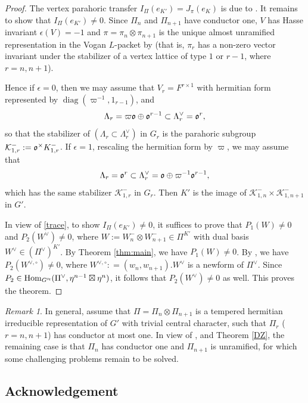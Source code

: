 \documentclass[11pt, a4paper]{amsart}
\newcommand{\CK}{{\mathcal {K}}}
\newcommand{\Hom}{{\mathrm{Hom}}}
\newcommand{\diag}{\operatorname{diag}}
\newcommand{\ve}{{\vee}}
\theoremstyle{plain}
\theoremstyle{plain}
\theoremstyle{plain}
\theoremstyle{plain}
\theoremstyle{remark}
\newtheorem{remarkl}[lem]{Remark}
\theoremstyle{definition}
\theoremstyle{plain}
\numberwithin{equation}{section}
\begin{document}
\begin{proof}
The vertex parahoric transfer  $I_\Pi(e_{K'}) = J_\pi(e_K)$ is due to \cite[Theorem 1.1]{Z}. It remains to show that $I_\Pi(e_{K'})\neq 0$. 
Since $\Pi_n$ and $\Pi_{n+1}$ have conductor one,  $V$ has Hasse invariant $\epsilon(V)= -1$ and $\pi = \pi_n\otimes \pi_{n+1}$ is the unique almost unramified representation in the Vogan $L$-packet by \cite[Lemma 3.6.7]{DZ} (that is, $\pi_r$ has a non-zero vector invariant under the stabilizer of a vertex lattice of type $1$ or $r-1$, where $r=n, n+1$).

Hence if $\epsilon =0$,  then we may assume that $V_r = F^{r\times 1}$ with hermitian form represented by $\diag(\varpi^{-1}, 1_{r-1})$,  and 
\[
\Lambda_r= \varpi\frak o \oplus \frak o^{r-1}\subset \Lambda_r^\vee = \frak o^r,
\]
so that the stabilizer of $(\Lambda_r \subset \Lambda_r^\vee)$ in $G_r$ is the parahoric subgroup $\CK_{1,r}^-:=\frak o^\times K_{1,r}^-$. If $\epsilon =1$,  rescaling the hermitian form by $\varpi$, we may assume that 
\[
\Lambda_r = \frak o^r \subset \Lambda_r^\ve = \frak o \oplus \varpi^{-1}\frak o^{r-1},
\]
which has the same stabilizer $\CK_{1,r}^-$ in $G_r$. 
Then $K'$ is the image of $\CK_{1,n}^-\times\CK_{1,n+1}^-$ in $G'$. 

In view of \eqref{trace}, to show  $I_\Pi(e_{K'})\neq 0$, it suffices to prove that $P_1(W) \neq 0$ and $P_2(W^\vee)\neq 0$, where $W:=W_n^-\otimes W_{n+1}^-\in \Pi^{K'}$ with dual basis $W^\vee \in (\Pi^\vee)^{K'}$. 
By Theorem \ref{thm:main}, we have $P_1(W)\neq 0$. By \cite[Theorem 6.1]{AM}, we have $P_2(W^{\vee,\circ})\neq 0$, where $W^{\vee, \circ}: =(w_n, w_{n+1}).W^\vee$ is a newform of $\Pi^\vee$. 
Since $P_2\in \Hom_{G'^{\sf c}}(\Pi^\vee, \eta^{n-1}\boxtimes \eta^n)$, it follows that $P_2(W^\vee)\neq 0$ as well. This proves the theorem.
\end{proof}

\begin{remarkl}
In general, assume that $\Pi=\Pi_n\otimes \Pi_{n+1}$ is a tempered hermitian irreducible representation of $G'$ with trivial central character, such that $\Pi_r$ ($r=n, n+1$) has conductor at most one. In view of \cite[Conjecture 3.10, Remark 3.11]{DZ},  \cite[Theorem 1.2]{D} and Theorem \ref{DZ}, the remaining case is that $\Pi_n$ has conductor one and $\Pi_{n+1}$ is unramified, for which some challenging problems remain to be solved.
\end{remarkl}

\subsection*{Acknowledgement} 
\end{document}
